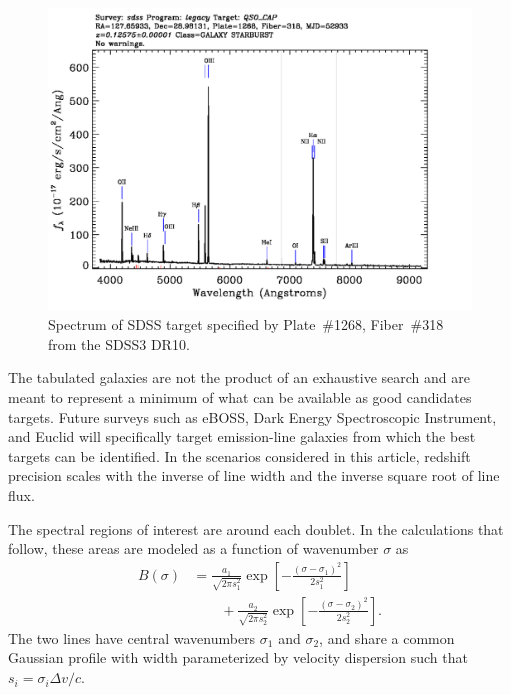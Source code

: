 \documentclass[preprint2, 10pt]{aastex}
\begin{document}
\begin{figure}[t]
   \centering
    \includegraphics[width=\columnwidth]{SpecById.pdf} 
   \caption{Spectrum of SDSS target specified by Plate~\#1268, Fiber~\#318 from the SDSS3 DR10.  \label{shsinput:fig}}
\end{figure}

The tabulated galaxies are not the product of an exhaustive search and are meant to represent a minimum of what can be available
as good
candidates targets.
Future surveys such as eBOSS, Dark Energy Spectroscopic Instrument, and Euclid will specifically target emission-line
galaxies from which the best targets can be identified.  In the scenarios considered in this article, redshift precision scales
with the inverse of line width and the inverse square root of line flux.

The spectral regions of interest
are around each doublet.  In the calculations that follow, these areas are modeled as a function of wavenumber $\sigma$ as
\begin{align}
B(\sigma)& =\frac{a_1}{\sqrt{2\pi s_1^2}}\exp{\left[-\frac{\left(\sigma-\sigma_1\right)^2}{2s_1^2}\right]} \nonumber\\
 &\qquad +\frac{a_2}{\sqrt{2\pi s_2^2}}\exp{\left[-\frac{\left(\sigma-\sigma_2\right)^2}{2s_2^2}\right]}.
\label{input:eqn}
\end{align}
The two lines have central wavenumbers $\sigma_1$ and $\sigma_2$, and share a common Gaussian profile with width parameterized by velocity dispersion
such that $s_i=\sigma_i\Delta v/c$. 


\end{document}
